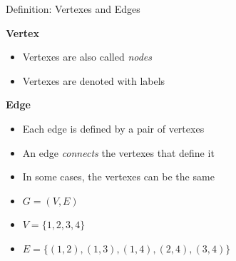 \documentclass[compress]{beamer}
\begin{document}
\begin{frame}{Definition: Vertexes and Edges}
  \begin{block}{\textbf{Vertex}}
      \begin{itemize}
      \item Vertexes are also called \emph{nodes}
      \item Vertexes are denoted with labels
    \end{itemize}
  \end{block}
  \begin{block}{\textbf{Edge}}
      \begin{itemize}
      \item Each edge is defined by a pair of vertexes
      \item An edge \emph{connects} the vertexes that define it
      \item In some cases, the vertexes can be the same
  \end{itemize}
\end{block}
\end{frame}

\begin{frame}{}
  \begin{example}
    \begin{itemize}
    \item $G = (V, E)$
    \item $V = \{1, 2, 3, 4\}$
    \item $E = \{(1,2), (1,3), (1,4), (2,4), (3,4)\}$
    \end{itemize}
  \end{example}
  \begin{center}
  
  \end{center}
\end{frame}
\end{document}
